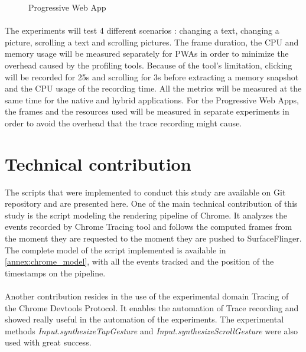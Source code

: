 \documentclass{kththesis}
\begin{document}
\begin{figure}
    \centering
    \hfill
    \hfill
    \hfill
    \hfill
    \caption{Progressive Web App}
    \label{fig:pwa_screens}
\end{figure}

\paragraph{}
The experiments will test 4 different scenarios : changing a text, changing a picture, scrolling a text and scrolling pictures. The frame duration, the CPU and memory usage will be measured separately for PWAs in order to minimize the overhead caused by the profiling tools. \newline
Because of the tool's limitation, clicking will be recorded for 25s and scrolling for 3s before extracting a memory snapshot and the CPU usage of the recording time. All the metrics will be measured at the same time for the native and hybrid applications. For the Progressive Web Apps, the frames and the resources used will be measured in separate experiments in order to avoid the overhead that the trace recording might cause.

\section{Technical contribution}

The scripts that were implemented to conduct this study are available on Git repository and are presented here. One of the main technical contribution of this study is the script modeling the rendering pipeline of Chrome. It analyzes the events recorded by Chrome Tracing tool and follows the computed frames from the moment they are requested to the moment they are pushed to SurfaceFlinger. The complete model of the script implemented is available in \autoref{annex:chrome_model}, with all the events tracked and the position of the timestamps on the pipeline.
\paragraph{}
Another contribution resides in the use of the experimental domain Tracing of the Chrome Devtools Protocol. It enables the automation of Trace recording and showed really useful in the automation of the experiments. The experimental methods \textit{Input.synthesizeTapGesture} and \textit{Input.synthesizeScrollGesture} were also used with great success.
\end{document}
